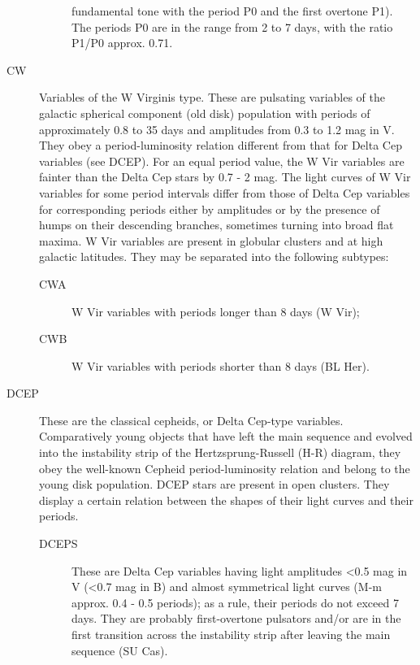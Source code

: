 \begin{description}
\begin{description}
				fundamental tone with the period P0 and the first overtone P1). The
				periods P0 are in the range from 2 to 7 days, with the ratio P1/P0
				approx. 0.71.
	\end{description}
\item[CW]		Variables of the W Virginis type. These are pulsating
				variables of the galactic spherical component (old disk) population with
				periods of approximately 0.8 to 35 days and amplitudes from 0.3 to 1.2
				mag in V. They obey a period-luminosity relation different from that for
				Delta Cep variables (see DCEP). For an equal period value, the W Vir
				variables are fainter than the Delta Cep stars by 0.7 - 2 mag. The light
				curves of W Vir variables for some period intervals differ from those of
				Delta Cep variables for corresponding periods either by amplitudes or by
				the presence of humps on their descending branches, sometimes turning
				into broad flat maxima. W Vir variables are present in globular clusters
				and at high galactic latitudes. They may be separated into the following
				subtypes:
	\begin{description}
\item[CWA]		W Vir variables with periods longer than 8 days (W Vir);
\item[CWB]		W Vir variables with periods shorter than 8 days (BL Her).
	\end{description}
\item[DCEP]		These are the classical cepheids, or Delta Cep-type
				variables. Comparatively young objects that have left the main sequence
				and evolved into the instability strip of the Hertzsprung-Russell (H-R)
				diagram, they obey the well-known Cepheid period-luminosity relation and
				belong to the young disk population. DCEP stars are present in open
				clusters. They display a certain relation between the shapes of their
				light curves and their periods.
	\begin{description}
\item[DCEPS] 	These are Delta Cep variables having light amplitudes
				\textless{}0.5 mag in V (\textless{}0.7 mag in B) and almost symmetrical
				light curves (M-m approx. 0.4 - 0.5 periods); as a rule, their periods
				do not exceed 7 days. They are probably first-overtone pulsators and/or
				are in the first transition across the instability strip after leaving
				the main sequence (SU Cas).
	

\end{description}
\end{description}
